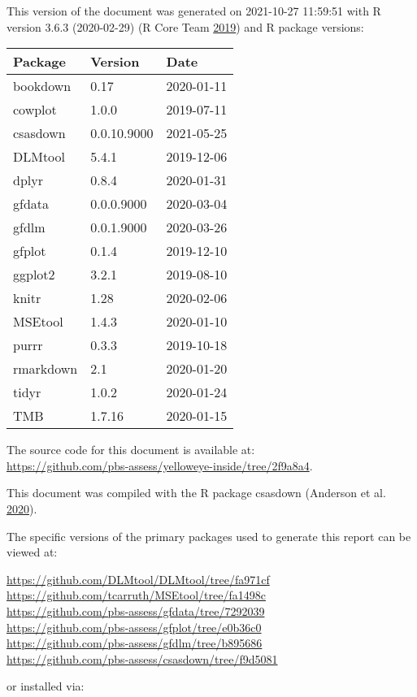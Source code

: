 \documentclass[11pt]{book}
\begin{document}
This version of the document was generated on 2021-10-27 11:59:51 with R version 3.6.3 (2020-02-29) (R Core Team \protect\hyperlink{ref-r2019}{2019}) and R package versions:
\begin{longtable}[]{@{}lll@{}}
\toprule
Package & Version & Date\tabularnewline
\midrule
\endhead
bookdown & 0.17 & 2020-01-11\tabularnewline
cowplot & 1.0.0 & 2019-07-11\tabularnewline
csasdown & 0.0.10.9000 & 2021-05-25\tabularnewline
DLMtool & 5.4.1 & 2019-12-06\tabularnewline
dplyr & 0.8.4 & 2020-01-31\tabularnewline
gfdata & 0.0.0.9000 & 2020-03-04\tabularnewline
gfdlm & 0.0.1.9000 & 2020-03-26\tabularnewline
gfplot & 0.1.4 & 2019-12-10\tabularnewline
ggplot2 & 3.2.1 & 2019-08-10\tabularnewline
knitr & 1.28 & 2020-02-06\tabularnewline
MSEtool & 1.4.3 & 2020-01-10\tabularnewline
purrr & 0.3.3 & 2019-10-18\tabularnewline
rmarkdown & 2.1 & 2020-01-20\tabularnewline
tidyr & 1.0.2 & 2020-01-24\tabularnewline
TMB & 1.7.16 & 2020-01-15\tabularnewline
\bottomrule
\end{longtable}
The source code for this document is available at:\\
\url{https://github.com/pbs-assess/yelloweye-inside/tree/2f9a8a4}.

This document was compiled with the R package csasdown (Anderson et al. \protect\hyperlink{ref-csasdown}{2020}).

The specific versions of the primary packages used to generate this report can be viewed at:

\url{https://github.com/DLMtool/DLMtool/tree/fa971cf}\\
\url{https://github.com/tcarruth/MSEtool/tree/fa1498c}~\\
\url{https://github.com/pbs-assess/gfdata/tree/7292039}~\\
\url{https://github.com/pbs-assess/gfplot/tree/e0b36c0}~\\
\url{https://github.com/pbs-assess/gfdlm/tree/b895686}~\\
\url{https://github.com/pbs-assess/csasdown/tree/f9d5081}~\\

\vspace{4mm}

or installed via:
\end{document}

